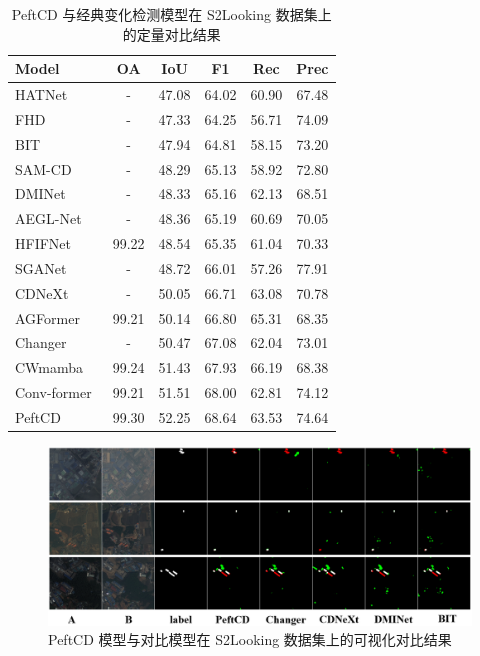\begin{table}[!htb]
\centering
\caption{PeftCD 与经典变化检测模型在 S2Looking 数据集上的定量对比结果}
\label{tab:peftcd_s2looking}
\begin{tabular}{l c c c c c}
\toprule
\textbf{Model} & \textbf{OA} & \textbf{IoU} & \textbf{F1} & \textbf{Rec} & \textbf{Prec} \\
\midrule
HATNet~\cite{Xu2024HybridAT} & - & 47.08 & 64.02 & 60.90 & 67.48 \\
FHD~\cite{pei_feature_2022} & - & 47.33 & 64.25 & 56.71 & 74.09 \\
BIT~\cite{chen_remote_2022} & - & 47.94 & 64.81 & 58.15 & 73.20 \\
SAM-CD~\cite{ding2024adapting} & - & 48.29 & 65.13 & 58.92 & 72.80 \\
DMINet~\cite{feng_change_2023} & - & 48.33 & 65.16 & 62.13 & 68.51 \\
AEGL-Net~\cite{Ying2025AEGLNetAM} & - & 48.36 & 65.19 & 60.69 & 70.05 \\
HFIFNet~\cite{Han2025HFIFNetHF} & 99.22 & 48.54 & 65.35 & 61.04 & 70.33 \\
SGANet~\cite{j_chen_sganet_2025} & - & 48.72 & 66.01 & 57.26 & 77.91 \\
CDNeXt~\cite{wei_robust_2024} & - & 50.05 & 66.71 & 63.08 & 70.78 \\
AGFormer~\cite{Chen2025AGFormerAA} & 99.21 & 50.14 & 66.80 & 65.31 & 68.35 \\
Changer~\cite{Fang2022ChangerFI} & - & 50.47 & 67.08 & 62.04 & 73.01 \\
CWmamba ~\cite{Liu2025CWmambaLC} & 99.24 & 51.43 & 67.93 & 66.19 & 68.38 \\
Conv-former~\cite{Yang2025ConvFormerCDHC} & 99.21 & 51.51 & 68.00 & 62.81 & 74.12 \\
PeftCD & 99.30 & 52.25 & 68.64 & 63.53 & 74.64 \\
\bottomrule
\end{tabular}
\end{table}


\begin{figure}[!htb]
  \centering
  \includegraphics[width=\textwidth]{paper_figures/基于AI基础模型微调的变化检测模型研究/PeftCD/peftcd_s2looking.png}
  \caption{PeftCD 模型与对比模型在 S2Looking 数据集上的可视化对比结果}
  \label{fig:peftcd_s2looking}
\end{figure}



